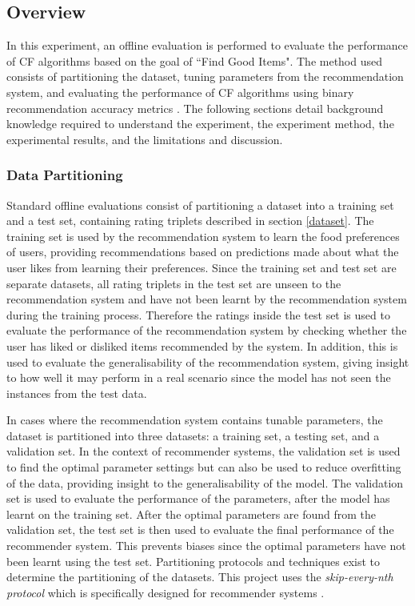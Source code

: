 \subsection{Overview}

In this experiment, an offline evaluation is performed to evaluate the performance of CF algorithms based on the goal of ``Find Good Items". The method used consists of partitioning the dataset, tuning parameters from the recommendation system, and evaluating the performance of CF algorithms using binary recommendation accuracy metrics \cite{zhang}. The following sections detail background knowledge required to understand the experiment, the experiment method, the experimental results, and the limitations and discussion. 

\subsubsection{Data Partitioning} \label{partitioning}

Standard offline evaluations consist of partitioning a dataset into a training set and a test set, containing rating triplets described in section \ref{dataset}. The training set is used by the recommendation system to learn the food preferences of users, providing recommendations based on predictions made about what the user likes from learning their preferences. Since the training set and test set are separate datasets, all rating triplets in the test set are unseen to the recommendation system and have not been learnt by the recommendation system during the training process. Therefore the ratings inside the test set is used to evaluate the performance of the recommendation system by checking whether the user has liked or disliked items recommended by the system. In addition, this is used to evaluate the generalisability of the recommendation system, giving insight to how well it may perform in a real scenario since the model has not seen the instances from the test data. 

In cases where the recommendation system contains tunable parameters, the dataset is partitioned into three datasets: a training set, a testing set, and a validation set. In the context of recommender systems, the validation set is used to find the optimal parameter settings but can also be used to reduce overfitting of the data, providing insight to the generalisability of the model. The validation set is used to evaluate the performance of the parameters, after the model has learnt on the training set. After the optimal parameters are found from the validation set, the test set is then used to evaluate the final performance of the recommender system. This prevents biases since the optimal parameters have not been learnt using the test set. Partitioning protocols and techniques exist to determine the partitioning of the datasets. This project uses the \textit{skip-every-nth protocol} which is specifically designed for recommender systems \cite{zhang}.

